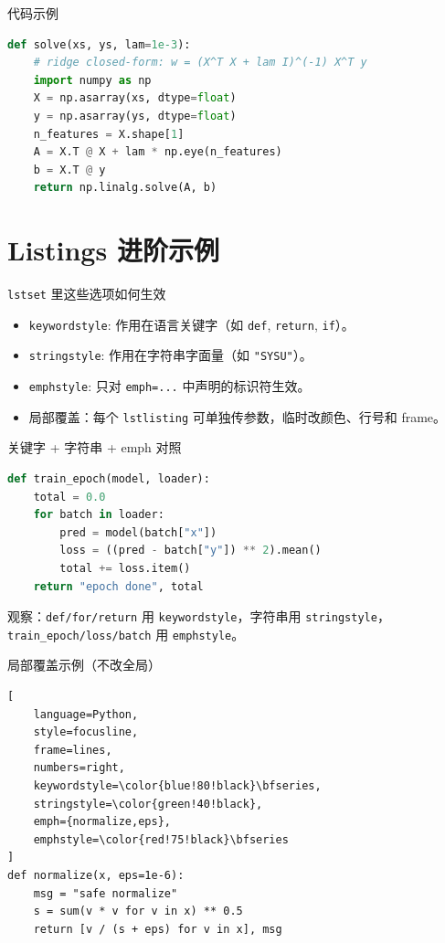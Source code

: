 \documentclass[11pt,aspectratio=169]{beamer}
\begin{document}
\begin{frame}[fragile]{代码示例}
\begin{lstlisting}[language=Python,style=sysucode,emph={solve,lam,n_features}]
def solve(xs, ys, lam=1e-3):
    # ridge closed-form: w = (X^T X + lam I)^(-1) X^T y
    import numpy as np
    X = np.asarray(xs, dtype=float)
    y = np.asarray(ys, dtype=float)
    n_features = X.shape[1]
    A = X.T @ X + lam * np.eye(n_features)
    b = X.T @ y
    return np.linalg.solve(A, b)
\end{lstlisting}
\end{frame}

\section{Listings 进阶示例}

\begin{frame}{\texttt{lstset} 里这些选项如何生效}
    \begin{itemize}
        \item \texttt{keywordstyle}: 作用在语言关键字（如 \texttt{def}, \texttt{return}, \texttt{if}）。
        \item \texttt{stringstyle}: 作用在字符串字面量（如 \texttt{"SYSU"}）。
        \item \texttt{emphstyle}: 只对 \texttt{emph={...}} 中声明的标识符生效。
        \item 局部覆盖：每个 \texttt{lstlisting} 可单独传参数，临时改颜色、行号和 frame。
    \end{itemize}
\end{frame}

\begin{frame}[fragile]{关键字 + 字符串 + emph 对照}
\begin{lstlisting}[language=Python,style=sysucode,emph={train_epoch,loss,batch},emphstyle=\bfseries\color{deepred}]
def train_epoch(model, loader):
    total = 0.0
    for batch in loader:
        pred = model(batch["x"])
        loss = ((pred - batch["y"]) ** 2).mean()
        total += loss.item()
    return "epoch done", total
\end{lstlisting}
\vspace{0.3em}
\small 观察：\texttt{def/for/return} 用 \texttt{keywordstyle}，字符串用 \texttt{stringstyle}，\texttt{train\_epoch/loss/batch} 用 \texttt{emphstyle}。
\end{frame}

\begin{frame}[fragile]{局部覆盖示例（不改全局）}
\begin{lstlisting}[
    language=Python,
    style=focusline,
    frame=lines,
    numbers=right,
    keywordstyle=\color{blue!80!black}\bfseries,
    stringstyle=\color{green!40!black},
    emph={normalize,eps},
    emphstyle=\color{red!75!black}\bfseries
]
def normalize(x, eps=1e-6):
    msg = "safe normalize"
    s = sum(v * v for v in x) ** 0.5
    return [v / (s + eps) for v in x], msg
\end{lstlisting}
\end{frame}
\end{document}
